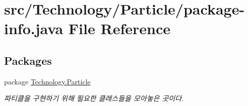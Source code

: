\hypertarget{_technology_2_particle_2package-info_8java}{\section{src/\-Technology/\-Particle/package-\/info.java File Reference}
\label{_technology_2_particle_2package-info_8java}
}
\subsection*{Packages}
\begin{DoxyCompactItemize}
\item 
package \hyperlink{namespace_technology_1_1_particle}{Technology.\-Particle}
\begin{DoxyCompactList}\small\item\em 파티클을 구현하기 위해 필요한 클래스들을 모아놓은 곳이다. \end{DoxyCompactList}\end{DoxyCompactItemize}
